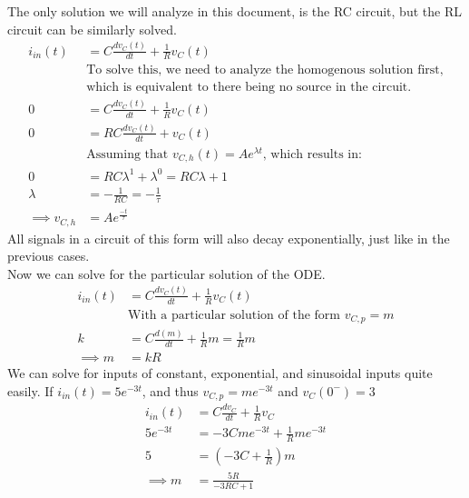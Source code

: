 \documentclass[nobib]{tufte-handout}
\begin{document}
The only solution we will analyze in this document, is the RC circuit, but the RL circuit can be similarly solved.
\begin{align*}
    i_{in}(t)        & = C\frac{dv_C(t)}{dt}+\frac{1}{R}v_C(t)                                 \\
                     & \text{To solve this, we need to analyze the homogenous solution first,} \\ &\text{which is equivalent to there being no source in the circuit.}\\
    0                & = C\frac{dv_C(t)}{dt}+\frac{1}{R}v_C(t)                                 \\
    0                & = RC\frac{dv_C(t)}{dt}+v_C(t)                                           \\
                     & \text{Assuming that $v_{C,h}(t) = Ae^{\lambda t}$, which results in:}   \\
    0                & = RC \lambda^1 + \lambda^0 = RC \lambda +1                              \\
    \lambda          & = -\frac{1}{RC} = -\frac{1}{\tau}                                       \\
    \implies v_{C,h} & = Ae^{\frac{-t}{\tau}}
\end{align*}
All signals in a circuit of this form will also decay exponentially, just like in the previous cases.\\
Now we can solve for the particular solution of the ODE.\\
\begin{align*}
    i_{in}(t)  & = C\frac{dv_C(t)}{dt}+\frac{1}{R}v_C(t)                   \\
               & \text{With a particular solution of the form $v_{C,p}=m$} \\
    k          & = C\frac{d(m)}{dt}+\frac{1}{R}m=\frac{1}{R}m              \\
    \implies m & =kR
\end{align*}
We can solve for inputs of constant, exponential, and sinusoidal inputs quite easily.
If $i_{in}(t) = 5e^{-3t}$, and thus $v_{C,p}=me^{-3t}$ and $v_C(0^-)=3$
\begin{align*}
    i_{in}(t)  & = C\frac{dv_C}{dt}+\frac{1}{R}v_C \\
    5e^{-3t}   & = -3Cme^{-3t}+\frac{1}{R}me^{-3t} \\
    5          & = \left(-3C+\frac{1}{R}\right)m   \\
    \implies m & = \frac{5R}{-3RC+1}
\end{align*}
\end{document}
